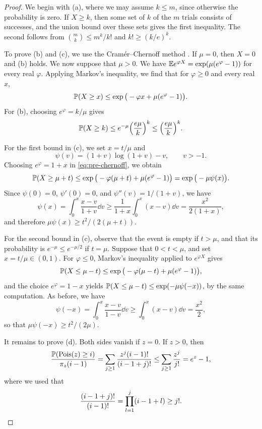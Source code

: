\begin{proof}
We begin with (a), where we may assume $k \le m$, since otherwise the probability is zero. If $X \ge k$, then some set of $k$ of the $m$ trials consists of successes, and the union bound over these sets gives the first inequality. The second follows from $\binom{m}{k} \le m^k/k!$ and $k! \ge (k/e)^k$.

To prove (b) and (c), we use the Cram\'er--Chernoff method \cite[Section~2.2]{boucheron2013concentration}. If $\mu = 0$, then $X = 0$ and (b) holds. We now suppose that $\mu > 0$. We have $\mathbb E e^{\varphi X} = \exp(\mu (e^\varphi - 1))$ for every real $\varphi$. Applying Markov's inequality, we find that for $\varphi \ge 0$ and every real $x$,
\begin{equation}\label{eq:pre-chernoff}
\mathbb P(X \ge x) \le \exp\big(-\varphi x + \mu (e^\varphi - 1)\big).
\end{equation}
For (b), choosing $e^\varphi = k/\mu$ gives
\[
\mathbb P(X \ge k) \le e^{-\mu} \Big(\frac{e\mu}{k}\Big)^k \le \Big(\frac{e\mu}{k}\Big)^k.
\]

For the first bound in (c), we set $x = t/\mu$ and
\[
\psi(v) = (1 + v) \log(1 + v) - v, \qquad v > -1.
\]
Choosing $e^\varphi = 1 + x$ in \eqref{eq:pre-chernoff}, we obtain
\[
\mathbb P(X \ge \mu + t) \le \exp\big(-\varphi (\mu + t) + \mu (e^\varphi - 1)\big) = \exp\big(-\mu \psi(x)\big).
\]
Since $\psi(0) = 0$, $\psi'(0) = 0$, and $\psi''(v) = 1/(1 + v)$, we have
\[
\psi(x) = \int_0^x \frac{x - v}{1 + v} \dd v \ge \frac{1}{1 + x} \int_0^x (x - v) \dd v = \frac{x^2}{2(1 + x)},
\]
and therefore $\mu \psi(x) \ge t^2/(2(\mu + t))$.

For the second bound in (c), observe that the event is empty if $t > \mu$, and that its probability is $e^{-\mu} \le e^{-\mu/2}$ if $t = \mu$. Suppose that $0 < t < \mu$, and set $x = t/\mu \in (0, 1)$. For $\varphi \le 0$, Markov's inequality applied to $e^{\varphi X}$ gives
\[
\mathbb P(X \le \mu - t) \le \exp\big(-\varphi (\mu - t) + \mu (e^\varphi - 1)\big),
\]
and the choice $e^\varphi = 1 - x$ yields $\mathbb P(X \le \mu - t) \le \exp(-\mu \psi(-x))$, by the same computation. As before, we have
\[
\psi(-x) = \int_0^x \frac{x - v}{1 - v} \dd v \ge \int_0^x (x - v) \dd v = \frac{x^2}{2},
\]
so that $\mu \psi(-x) \ge t^2/(2\mu)$.

It remains to prove (d). Both sides vanish if $z = 0$. If $z > 0$, then
\[
\frac{\mathbb P(\operatorname{Pois}(z) \ge i)}{\pi_z(i - 1)} = \sum_{j \ge 1} \frac{z^j (i - 1)!}{(i - 1 + j)!} \le \sum_{j \ge 1} \frac{z^j}{j!} = e^z - 1,
\]
where we used that
\[
\frac{(i - 1 + j)!}{(i - 1)!} = \prod_{l = 1}^{j} (i - 1 + l) \ge j!. \qedhere
\]
\end{proof}

